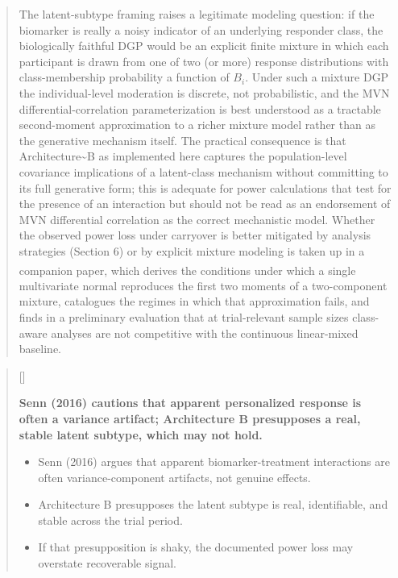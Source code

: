 \documentclass[
  11pt,
]{article}
\newcounter{pgraph}
\newenvironment{bullets}{%
  \stepcounter{pgraph}%
  \begin{quote}\small\sffamily\color[gray]{0.30}%
  {\normalfont\scriptsize\color[gray]{0.58}[\thepgraph]\enspace}}{%
  \end{quote}}
\newenvironment{orig}{%
  \begin{quote}\normalsize\color[gray]{0.55}}{%
  \end{quote}}
\begin{document}
\begin{orig}
The latent-subtype framing raises a legitimate modeling question: if the
biomarker is really a noisy indicator of an underlying responder class,
the biologically faithful DGP would be an explicit finite mixture in
which each participant is drawn from one of two (or more) response
distributions with class-membership probability a function of \(B_i\).
Under such a mixture DGP the individual-level moderation is discrete,
not probabilistic, and the MVN differential-correlation parameterization
is best understood as a tractable second-moment approximation to a
richer mixture model rather than as the generative mechanism itself. The
practical consequence is that Architecture\textasciitilde B as
implemented here captures the population-level covariance implications
of a latent-class mechanism without committing to its full generative
form; this is adequate for power calculations that test for the presence
of an interaction but should not be read as an endorsement of MVN
differential correlation as the correct mechanistic model. Whether the
observed power loss under carryover is better mitigated by analysis
strategies (Section 6) or by explicit mixture modeling is taken up in a
companion paper\textsuperscript{},
which derives the conditions under which a single multivariate normal
reproduces the first two moments of a two-component mixture, catalogues
the regimes in which that approximation fails, and finds in a
preliminary evaluation that at trial-relevant sample sizes class-aware
analyses are not competitive with the continuous linear-mixed baseline.

\end{orig}

\begin{bullets}

\textbf{Senn (2016) cautions that apparent personalized
response is often a variance artifact; Architecture B
presupposes a real, stable latent subtype, which may not hold.}

\begin{itemize}\setlength{\itemsep}{2pt}\setlength{\parskip}{0pt}
\item Senn (2016) argues that apparent biomarker-treatment
  interactions are often variance-component artifacts, not
  genuine effects.
\item Architecture B presupposes the latent subtype is real,
  identifiable, and stable across the trial period.
\item If that presupposition is shaky, the documented power
  loss may overstate recoverable signal.
\end{itemize}

\end{bullets}
\end{document}
